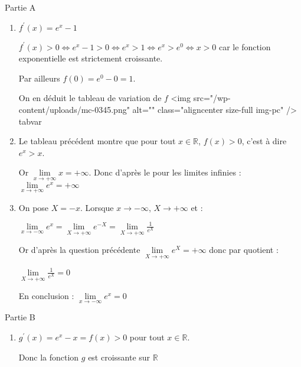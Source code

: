 \begin{corrige}
     \begin{h3}Partie A\end{h3}
     \begin{enumerate}
          \item
          $f^{\prime}\left(x\right)=e^{x}-1$
          \par
          $f^{\prime}\left(x\right) > 0  \Leftrightarrow  e^{x}-1 > 0  \Leftrightarrow  e^{x} > 1  \Leftrightarrow  e^{x} > e^{0}  \Leftrightarrow   x > 0$ car le fonction exponentielle est strictement croissante.
          \par
          Par ailleurs $f\left(0\right)=e^{0}-0=1$.
          \par
          On en déduit le tableau de variation de $f$
          <img src="/wp-content/uploads/mc-0345.png" alt="" class="aligncenter size-full  img-pc" />
tabvar
          \item
          Le tableau précédent montre que pour tout $x \in  \mathbb{R}$, $f\left(x\right) > 0$, c'est à dire $e^{x} > x$.
          \par
          Or $\lim\limits_{x\rightarrow +\infty }x=+\infty $. Donc d'après le   pour les limites infinies : $\lim\limits_{x\rightarrow +\infty }e^{x}=+\infty $
          \item
          On pose $X=-x$. Lorsque $x\rightarrow -\infty $, $X\rightarrow +\infty $ et :
          \par
          $\lim\limits_{x\rightarrow -\infty }e^{x}=\lim\limits_{X\rightarrow +\infty }e^{-X}=\lim\limits_{X\rightarrow +\infty }\frac{1}{e^{X}}$
          \par
          Or d'après la question précédente $\lim\limits_{X\rightarrow +\infty }e^{X}=+\infty $ donc par quotient :
          \par
          $\lim\limits_{X\rightarrow +\infty }\frac{1}{e^{X}}=0$
          \par
          En conclusion :  $\lim\limits_{x\rightarrow -\infty }e^{x}=0$
     \end{enumerate}
     \begin{h3}Partie B\end{h3}
     \begin{enumerate}
          \item
          $g^{\prime}\left(x\right)=e^{x}-x=f\left(x\right) > 0$ pour tout $x \in  \mathbb{R}$.
          \par
          Donc la fonction $g$ est croissante sur $\mathbb{R}$

\end{enumerate}
\end{corrige}
